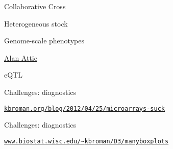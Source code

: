 \documentclass[12pt,t]{beamer}
\begin{document}
\begin{frame}[c]{Collaborative Cross}


\end{frame}





\begin{frame}[c]{Heterogeneous stock}

  \vspace{2mm}


\end{frame}


\begin{frame}[c]{Genome-scale phenotypes}
\vspace*{5mm}

\hfill
\href{https://biochem.wisc.edu/faculty/attie}{\scriptsize \lolit Alan
  Attie} \hspace{8mm}
\end{frame}


\begin{frame}[c]{eQTL}
\end{frame}



\begin{frame}{Challenges: {\color{foreground} diagnostics}}

\vspace{2mm}


\vspace{3mm}

\hfill \href{http://kbroman.org/blog/2012/04/25/microarrays-suck}{\scriptsize \lolit \tt kbroman.org/blog/2012/04/25/microarrays-suck}

\end{frame}


\begin{frame}{Challenges: {\color{foreground} diagnostics}}

  \vspace{2mm}


\vspace{3mm}

\hfill
\href{https://www.biostat.wisc.edu/~kbroman/D3/manyboxplots/}{\scriptsize
  \lolit \tt www.biostat.wisc.edu/{\textasciitilde}kbroman/D3/manyboxplots}

\end{frame}
\end{document}

